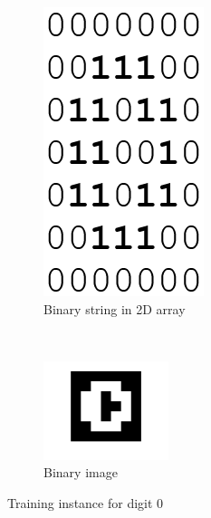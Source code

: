 \documentclass[paper=letter, fontsize=10pt]{scrartcl} %
\numberwithin{equation}{section} %
\numberwithin{figure}{section} %
\numberwithin{table}{section} %
\begin{document}
\begin{figure}[h]
        \centering
        \begin{subfigure}[b]{0.4\textwidth}
\centering
                \includegraphics[scale=0.25]{digit0raw.png}
                \caption{Binary string in 2D array}
                \label{fig:zero2d}
        \end{subfigure}%
        ~ %
        \begin{subfigure}[b]{0.4\textwidth}
\centering
                \includegraphics[trim=1cm 1cm 1cm 1cm, width=0.4\textwidth]{digit0.png}
                \caption{Binary image}
                \label{fig:zeroim}
        \end{subfigure}
\caption{Training instance for digit 0}
\end{figure}
\end{document}

